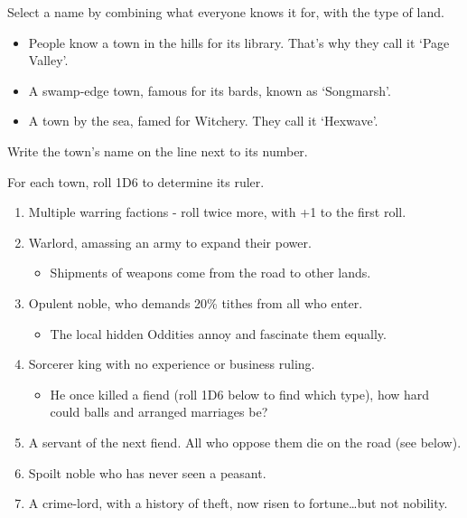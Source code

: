 \begin{multicols}{2}
\begin{multicols}{2}
\end{multicols}


Select a name by combining what everyone knows it for, with the type of
land.

\begin{itemize}
\item
  People know a town in the hills for its library. That's why they call
  it `Page Valley'.
\item
  A swamp-edge town, famous for its bards, known as `Songmarsh'.
\item
  A town by the sea, famed for Witchery. They call it `Hexwave'.
\end{itemize}

Write the town's name on the line next to its number.


For each town, roll 1D6 to determine its ruler.

\begin{enumerate}
\item
  Multiple warring factions - roll twice more, with +1 to the first
  roll.
\item
  Warlord, amassing an army to expand their power.

  \begin{itemize}
  \item
    Shipments of weapons come from the road to other lands.
  \end{itemize}
\item
  Opulent noble, who demands 20\% tithes from all who enter.

  \begin{itemize}
  \item
    The local hidden Oddities annoy and fascinate them equally.
  \end{itemize}
\item
  Sorcerer king with no experience or business ruling.

  \begin{itemize}
  \item
    He once killed a fiend (roll 1D6 below to find which type), how hard
    could balls and arranged marriages be?
  \end{itemize}
\item
  A servant of the next fiend. All who oppose them die on the road (see
  below).
\item
  Spoilt noble who has never seen a peasant.
\item
  A crime-lord, with a history of theft, now risen to fortune\ldots but
  not nobility.
\end{enumerate}


\end{multicols}
